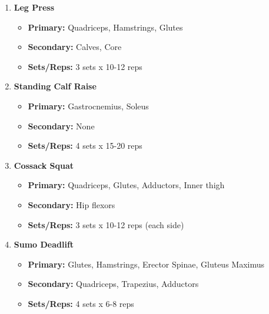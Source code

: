 \documentclass{article}
\begin{document}
\begin{enumerate}[label=\arabic*., wide=0pt, leftmargin=*]
    \item \textbf{Leg Press}
        \begin{itemize}[label=\textbullet, leftmargin=*, nosep, topsep=0pt, partopsep=0pt]
            \item \textbf{Primary:} Quadriceps, Hamstrings, Glutes
            \item \textbf{Secondary:} Calves, Core
            \item \textbf{Sets/Reps:} 3 sets x 10-12 reps
        \end{itemize}

    \item \textbf{Standing Calf Raise}
        \begin{itemize}[label=\textbullet, leftmargin=*, nosep, topsep=0pt, partopsep=0pt]
            \item \textbf{Primary:} Gastrocnemius, Soleus
            \item \textbf{Secondary:} None
            \item \textbf{Sets/Reps:} 4 sets x 15-20 reps
        \end{itemize}

    \item \textbf{Cossack Squat}
        \begin{itemize}[label=\textbullet, leftmargin=*, nosep, topsep=0pt, partopsep=0pt]
            \item \textbf{Primary:} Quadriceps, Glutes, Adductors, Inner thigh
            \item \textbf{Secondary:} Hip flexors
            \item \textbf{Sets/Reps:} 3 sets x 10-12 reps (each side)
        \end{itemize}

    \item \textbf{Sumo Deadlift}
        \begin{itemize}[label=\textbullet, leftmargin=*, nosep, topsep=0pt, partopsep=0pt]
            \item \textbf{Primary:} Glutes, Hamstrings, Erector Spinae, Gluteus Maximus
            \item \textbf{Secondary:} Quadriceps, Trapezius, Adductors
            \item \textbf{Sets/Reps:} 4 sets x 6-8 reps
        \end{itemize}
\end{enumerate}
\end{document}
